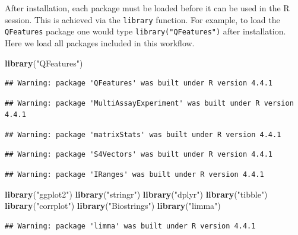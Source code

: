 \documentclass[9pt,a4paper,]{extarticle}
\newenvironment{Shaded}{\begin{snugshade}}{\end{snugshade}}
\newcommand{\FunctionTok}[1]{\textcolor[rgb]{0.13,0.29,0.53}{\textbf{#1}}}
\newcommand{\NormalTok}[1]{#1}
\newcommand{\StringTok}[1]{\textcolor[rgb]{0.31,0.60,0.02}{#1}}
\begin{document}
After installation, each package must be loaded before it can be used in the R
session. This is achieved via the \texttt{library} function. For example, to load the
\texttt{QFeatures} package one would type \texttt{library("QFeatures")} after installation.
Here we load all packages included in this workflow.

\begin{Shaded}
\begin{Highlighting}[]
\FunctionTok{library}\NormalTok{(}\StringTok{"QFeatures"}\NormalTok{)}
\end{Highlighting}
\end{Shaded}

\begin{verbatim}
## Warning: package 'QFeatures' was built under R version 4.4.1
\end{verbatim}

\begin{verbatim}
## Warning: package 'MultiAssayExperiment' was built under R version 4.4.1
\end{verbatim}

\begin{verbatim}
## Warning: package 'matrixStats' was built under R version 4.4.1
\end{verbatim}

\begin{verbatim}
## Warning: package 'S4Vectors' was built under R version 4.4.1
\end{verbatim}

\begin{verbatim}
## Warning: package 'IRanges' was built under R version 4.4.1
\end{verbatim}

\begin{Shaded}
\begin{Highlighting}[]
\FunctionTok{library}\NormalTok{(}\StringTok{"ggplot2"}\NormalTok{)}
\FunctionTok{library}\NormalTok{(}\StringTok{"stringr"}\NormalTok{)}
\FunctionTok{library}\NormalTok{(}\StringTok{"dplyr"}\NormalTok{)}
\FunctionTok{library}\NormalTok{(}\StringTok{"tibble"}\NormalTok{)}
\FunctionTok{library}\NormalTok{(}\StringTok{"corrplot"}\NormalTok{)}
\FunctionTok{library}\NormalTok{(}\StringTok{"Biostrings"}\NormalTok{)}
\FunctionTok{library}\NormalTok{(}\StringTok{"limma"}\NormalTok{)}
\end{Highlighting}
\end{Shaded}

\begin{verbatim}
## Warning: package 'limma' was built under R version 4.4.1
\end{verbatim}
\end{document}
